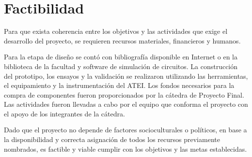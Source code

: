 \section{Factibilidad}

Para que exista coherencia entre los objetivos y las actividades que exige el desarrollo del proyecto,
se requieren recursos materiales, financieros y humanos. 

Para la etapa de diseño se contó con bibliografía disponible en Internet o en la biblioteca de la facultad y software de simulación de circuitos.
La construcción del prototipo, los ensayos y la validación se realizaron utilizando las herramientas, el equipamiento y la instrumentación del ATEI. 
Los fondos necesarios para la compra de componentes fueron proporcionados por la cátedra de Proyecto Final.
Las actividades fueron llevadas a cabo por el equipo que conforma el proyecto con el apoyo de los integrantes de la cátedra.

Dado que el proyecto no depende de factores socioculturales o políticos, en base a la disponibilidad y correcta asignación
de todos los recursos previamente nombrados, es factible y viable cumplir con los objetivos y las metas establecidas. 